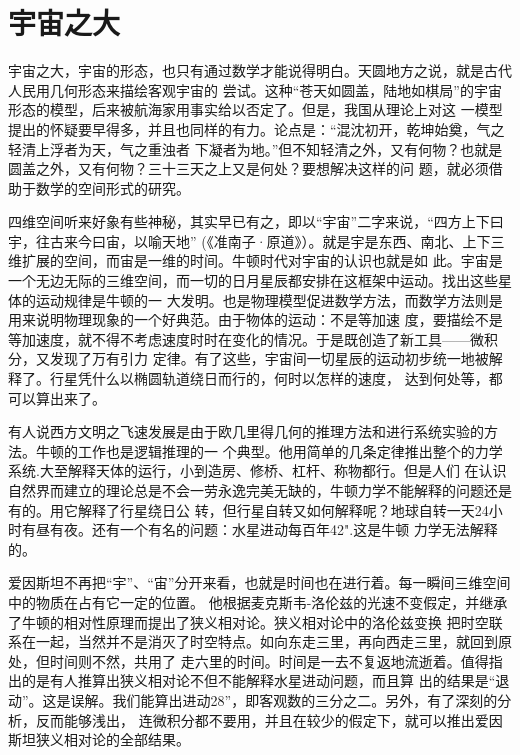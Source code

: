 \documentclass[twoside,openright,headings=optiontohead]{ctexbook} %
\begin{document}
{\hypertarget{ux5b87ux5b99ux4e4bux5927}{%
\section*{宇宙之大}\label{ux5b87ux5b99ux4e4bux5927}}

宇宙之大，宇宙的形态，也只有通过数学才能说得明白。天圆地方之说，就是古代人民用几何形态来描绘客观宇宙的
尝试。这种``苍天如圆盖，陆地如棋局''的宇宙形态的模型，后来被航海家用事实给以否定了。但是，我国从理论上对这
一模型提出的怀疑要早得多，并且也同样的有力。论点是：``混沈初开，乾坤始奠，气之轻清上浮者为天，气之重浊者
下凝者为地。''但不知轻清之外，又有何物？也就是圆盖之外，又有何物？三十三天之上又是何处？要想解决这样的问
题，就必须借助于数学的空间形式的研究。

四维空间听来好象有些神秘，其实早已有之，即以``宇宙''二字来说，``四方上下曰宇，往古来今曰宙，以喻天地''
(《准南子·原道》）。就是宇是东西、南北、上下三维扩展的空间，而宙是一维的时间。牛顿时代对宇宙的认识也就是如
此。宇宙是一个无边无际的三维空间，而一切的日月星辰都安排在这框架中运动。找出这些星体的运动规律是牛顿的一
大发明。也是物理模型促进数学方法，而数学方法则是用来说明物理现象的一个好典范。由于物体的运动：不是等加速
度，要描绘不是等加速度，就不得不考虑速度时时在变化的情况。于是既创造了新工具------微积分，又发现了万有引力
定律。有了这些，宇宙间一切星辰的运动初步统一地被解释了。行星凭什么以椭圆轨道绕日而行的，何时以怎样的速度，
达到何处等，都可以算出来了。

有人说西方文明之飞速发展是由于欧几里得几何的推理方法和进行系统实验的方法。牛顿的工作也是逻辑推理的一
个典型。他用简单的几条定律推出整个的力学系统.大至解释天体的运行，小到造房、修桥、杠杆、称物都行。但是人们
在认识自然界而建立的理论总是不会一劳永逸完美无缺的，牛顿力学不能解释的问题还是有的。用它解释了行星绕日公
转，但行星自转又如何解释呢？地球自转一天24小时有昼有夜。还有一个有名的问题：水星进动每百年42".这是牛顿
力学无法解释的。

爱因斯坦不再把``宇''、``宙''分开来看，也就是时间也在进行着。每一瞬间三维空间中的物质在占有它一定的位置。
他根据麦克斯韦-洛伦兹的光速不变假定，并继承了牛顿的相对性原理而提出了狭义相对论。狭义相对论中的洛伦兹变换
把时空联系在一起，当然并不是消灭了时空特点。如向东走三里，再向西走三里，就回到原处，但时间则不然，共用了
走六里的时间。时间是一去不复返地流逝着。值得指出的是有人推算出狭义相对论不但不能解释水星进动问题，而且算
出的结果是``退动''。这是误解。我们能算出进动28''，即客观数的三分之二。另外，有了深刻的分析，反而能够浅出，
连微积分都不要用，并且在较少的假定下，就可以推出爱因斯坦狭义相对论的全部结果。

}
\end{document}
